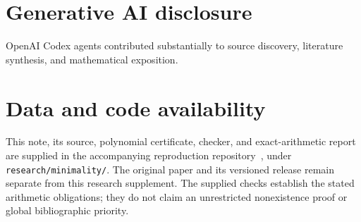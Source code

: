 \documentclass[11pt,a4paper]{article}
\begin{document}
\section*{Generative AI disclosure}
OpenAI Codex agents contributed substantially to source discovery,
literature synthesis, and mathematical exposition.

\section*{Data and code availability}
This note, its source, polynomial certificate, checker, and exact-arithmetic
report are supplied in the accompanying reproduction repository~\cite{paper},
under \texttt{research/minimality/}. The original paper and its versioned
release remain separate from this research supplement. The supplied
checks establish the stated arithmetic obligations; they do not claim
an unrestricted nonexistence proof or global bibliographic priority.
\end{document}
